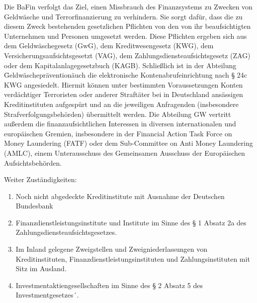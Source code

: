 \documentclass{article}
\begin{document}
\begin{enumerate}
                    Die BaFin verfolgt das Ziel, einen Missbrauch des Finanzsystems zu Zwecken von Geldwäsche und Terrorfinanzierung zu verhindern. Sie sorgt dafür, dass die zu diesem Zweck bestehenden gesetzlichen Pflichten von den von ihr beaufsichtigten Unternehmen und Personen umgesetzt werden. Diese Pflichten ergeben sich aus dem Geldwäschegesetz (GwG), dem Kreditwesengesetz (KWG), dem Versicherungsaufsichtsgesetzt (VAG), dem Zahlungsdiensteaufsichtsgesetz (ZAG) oder dem Kapitalanlagegesetzbuch (KAGB). Schließlich ist in der Abteilung \"Geldwäscheprävention\" auch die elektronische Kontenabrufeinrichtung nach § 24c KWG angesiedelt. Hiermit können unter bestimmten Voraussetzungen Konten verdächtiger Terroristen oder anderer Straftäter bei in Deutschland ansässigen Kreditinstituten aufgespürt und an die jeweiligen Anfragenden (insbesondere Strafverfolgungsbehörden) übermittelt werden. Die Abteilung GW vertritt außerdem die finanzaufsichtlichen Interessen in diversen internationalen und europäischen Gremien, insbesondere in der Financial Action Task Force on Money Laundering (FATF) oder dem Sub-Committee on Anti Money Laundering (AMLC), einem Unterausschuss des Gemeinsamen Ausschuss der Europäischen Aufsichtsbehörden.
                   
                    Weiter Zuständigkeiten: 
                    \begin{enumerate}
                        \item
                            
                            Noch nicht abgedeckte Kreditinstitute mit Ausnahme der Deutschen Bundesbank

                        \item

                            Finanzdienstleistungsinstitute und Institute im Sinne des § 1 Absatz
                            2a des Zahlungsdiensteaufsichtsgesetzes.

                        \item

                            Im Inland gelegene Zweigstellen und Zweigniederlassungen von
                            Kreditinstituten, Finanzdienstleistungsinstituten und
                            Zahlungsinstituten mit Sitz im Ausland.

                        \item

                            Investmentaktiengesellschaften im Sinne des § 2 Absatz 5 des
                            Investmentgesetzes´.


\end{enumerate}
\end{enumerate}
\end{document}
